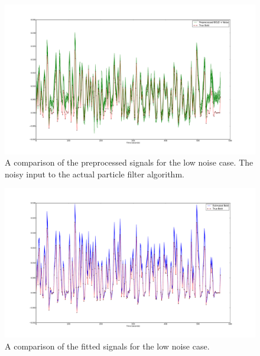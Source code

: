 \begin{figure}
\centering
\includegraphics[clip=true,trim=6cm 2cm 5cm 3.5cm,width=15cm]{images/preprocessed_lownoise}
\caption{A comparison of the preprocessed signals for the low noise case. The
noisy input to the actual particle filter algorithm.}
\label{fig:PreprocessedLowNoise}
\end{figure}

\begin{figure}
\centering
\includegraphics[clip=true,trim=6cm 2cm 5cm 3.5cm,width=15cm]{images/comparison_lownoise}
\caption{A comparison of the fitted signals for the low noise case.}
\label{fig:FitComparisonLowNoise}
\end{figure}

